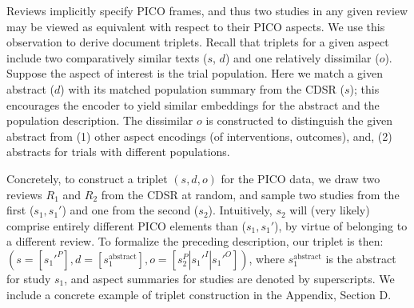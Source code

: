 \documentclass[11pt,a4paper]{article}
\begin{document}


Reviews implicitly specify PICO frames, and thus two studies in any given review may be viewed as equivalent with respect to their PICO aspects. We use this observation to derive document triplets. Recall that triplets for a given aspect include two comparatively similar texts ($s$, $d$) and one relatively dissimilar ($o$). Suppose the aspect of interest is the trial population. Here we match a given abstract ($d$) with its matched population summary from the CDSR ($s$); this encourages the encoder to yield similar embeddings for the abstract and the population description. The dissimilar $o$ is constructed to distinguish the given abstract from (1) other aspect encodings (of interventions, outcomes), and, (2) abstracts for trials with different populations.

Concretely, to construct a triplet  $(s, d, o)$ for the PICO data, we draw two reviews $R_1$ and $R_2$ from the CDSR at random, and sample two studies from the first ($s_1, s_1'$) and one from the second ($s_2$). Intuitively, $s_2$ will (very likely) comprise entirely different PICO elements than ($s_1, s_1'$), by virtue of belonging to a different review. To formalize the preceding description, our triplet is then: $(s = [s_1'^P], d = [s_1^{\text{abstract}}], o = [s_2^P|s_1'^I|s_1'^O])$, where $s_1^{\text{abstract}}$ is the abstract for study $s_1$, and aspect summaries for studies are denoted by superscripts. We include a concrete example of triplet construction in the Appendix, Section D.
\end{document}
